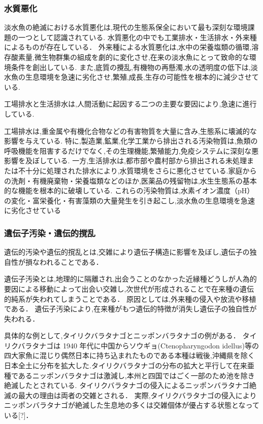 \documentclass[12pt,a4j,titlepage]{ltjsarticle}
\begin{document}
\subsubsection{水質悪化}
淡水魚の絶滅における水質悪化は,現代の生態系保全において最も深刻な環境課題の一つとして認識されている.
水質悪化の中でも工業排水・生活排水・外来種によるものが存在している．
外来種による水質悪化は,水中の栄養塩類の循環,溶存酸素量,微生物群集の組成を劇的に変化させ,在来の淡水魚にとって致命的な環境条件を創出している.
また,底質の攪乱,有機物の再懸濁,水の透明度の低下は,淡水魚の生息環境を急速に劣化させ,繁殖,成長,生存の可能性を根本的に減少させている.

工場排水と生活排水は,人間活動に起因する二つの主要な要因により,急速に進行している.

工場排水は,重金属や有機化合物などの有害物質を大量に含み,生態系に壊滅的な影響を与えている.
特に,製造業,鉱業,化学工業から排出される汚染物質は,魚類の呼吸機能を阻害するだけでなく,その生理機能,繁殖能力,免疫システムに深刻な悪影響を及ぼしている.
一方,生活排水は,都市部や農村部から排出される未処理または不十分に処理された排水により,水質環境をさらに悪化させている.家庭からの洗剤・有機廃棄物・栄養塩類などのほか,医薬品の残留物は,水生生態系の基本的な機能を根本的に破壊している.
これらの汚染物質は,水素イオン濃度（pH）の変化・富栄養化・有害藻類の大量発生を引き起こし,淡水魚の生息環境を急速に劣化させている

\subsubsection{遺伝子汚染・遺伝的撹乱}
遺伝的汚染や遺伝的撹乱とは,交雑により遺伝子構造に影響を及ぼし,遺伝子の独自性が損なわれることである．

遺伝子汚染とは,地理的に隔離され,出会うことのなかった近縁種どうしが人為的要因による移動によって出会い交雑し,次世代が形成されることで在来種の遺伝的純系が失われてしまうことである．
原因としては,外来種の侵入や放流や移植である．
遺伝子汚染により,在来種がもつ遺伝的特徴が消失し遺伝子の独自性が失われる．

具体的な例として,タイリクバラタナゴとニッポンバラタナゴの例がある．
タイリクバラタナゴは 1940 年代に中国からソウギョ(Ctenopharyngodon idellus)等の四大家魚に混じり偶然日本に持ち込まれたものである本種は戦後,沖縄県を除く日本全土に分布を拡大した.タイリクバラタナゴの分布の拡大と平行して在来亜種であるニッポンバラタナゴは激減し,本州と四国ではごく一部のため池を除き絶滅したとされている.
タイリクバラタナゴの侵入によるニッポンバラタナゴ絶滅の最大の理由は両者の交雑とされる．
実際,タイリクバラタナゴの侵入によりニッポンバラタナゴが絶滅した生息地の多くは交雑個体が優占する状態となっている[?]．
\end{document}
